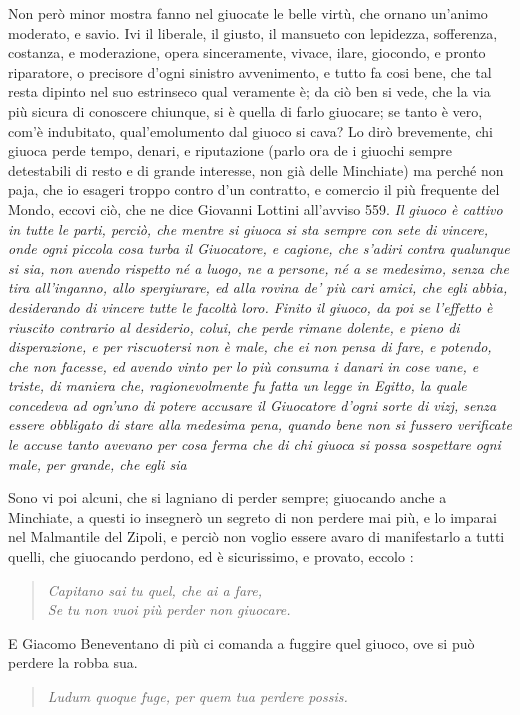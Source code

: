 \documentclass[11pt,a6paper]{article}
\newcommand{\literaryquote}[1]{%
\kern -6pt  \begin{verse}
    {\footnotesize \it #1}
  \end{verse}\kern -2pt%
}
\begin{document}
{Non però minor mostra fanno nel giuocate le
belle virtù, che ornano un'animo moderato, e
savio. Ivi il liberale, il giusto, il mansueto con
lepidezza, sofferenza, costanza, e moderazione, opera
sinceramente, vivace, ilare, giocondo, e pronto
riparatore, o precisore d'ogni sinistro avvenimento,
e tutto fa cosi bene, che tal resta dipinto nel suo
estrinseco qual veramente è; da ciò ben si vede, che
la via più sicura di conoscere chiunque, si è quella di
farlo giuocare; se tanto è vero, com'è indubitato,
qual'emolumento dal giuoco si cava? Lo dirò
brevemente, chi giuoca perde tempo, denari, e
riputazione (parlo ora de i giuochi sempre detestabili di
resto e di grande interesse, non già delle
Minchiate) ma perché non paja, che io esageri troppo
contro d'un contratto, e comercio il più frequente del
Mondo, eccovi ciò, che ne dice Giovanni Lottini
all'avviso 559. \textit{Il giuoco è cattivo in tutte le parti,
perciò, che mentre si giuoca si sta sempre con sete di
vincere, onde ogni piccola cosa turba il Giuocatore,
e cagione, che s'adiri contra qualunque si sia, non
avendo rispetto né a luogo, ne a persone, né a se
medesimo, senza che tira all'inganno, allo
spergiurare, ed alla rovina de' più cari amici, che egli abbia,
desiderando di vincere tutte le facoltà loro. Finito il
giuoco, da poi se l'effetto è riuscito contrario al
desiderio, colui, che perde rimane dolente, e pieno di
disperazione, e per riscuotersi non è male, che ei non
pensa di fare, e potendo, che non facesse, ed avendo
vinto per lo più consuma i danari in cose vane, e
triste, di maniera che, ragionevolmente fu fatta un
legge in Egitto, la quale concedeva ad ogn'uno di
potere accusare il Giuocatore d'ogni sorte di vizj,
senza essere obbligato di stare alla medesima pena,
quando bene non si fussero verificate le accuse tanto
avevano per cosa ferma che di chi giuoca si possa
sospettare ogni male, per grande, che egli sia}

Sono vi poi alcuni, che si lagniano di perder
sempre; giuocando anche a Minchiate, a questi io
insegnerò un segreto di non perdere mai più, e lo
imparai nel Malmantile del Zipoli, e perciò non
voglio essere avaro di manifestarlo a tutti quelli, che
giuocando perdono, ed è sicurissimo, e provato,
eccolo :
\literaryquote{Capitano sai tu quel, che ai a fare, \\
 Se tu non vuoi più perder non giuocare.}

E Giacomo Beneventano di più ci comanda a fuggire
quel giuoco, ove si può perdere la robba sua.
\literaryquote{
Ludum quoque fuge, per quem tua perdere possis.}

}
\end{document}
